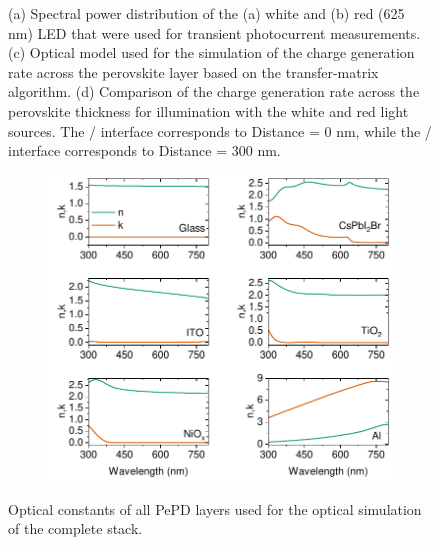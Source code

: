 \begin{figure}[t]
\begin{subfigure}[t]{0.4\textwidth}
        \caption{}
        \label{}
    \end{subfigure}
    \caption{(a) Spectral power distribution of the (a) white and (b) red (625 nm) LED that were used for transient photocurrent measurements. (c) Optical model used for the simulation of the charge generation rate across the perovskite layer based on the transfer-matrix algorithm. (d) Comparison of the charge generation rate across the perovskite thickness for illumination with the white and red light sources. The / interface corresponds to Distance = 0 nm, while the / interface corresponds to Distance = 300 nm.}
    \label{fig:etl_opt:tpc_sources_and_simulation}
\end{figure}



\begin{figure}[htbp]
    \centering
    \begin{subfigure}[t]{0.7\textwidth}
        \centering
        \includegraphics[width=\textwidth]{chapters/transport_layers/images/nk_transfer_matrix.pdf} %
                
    \end{subfigure}
    \caption{Optical constants of all PePD layers used for the optical simulation of the complete stack.}
    \label{fig:tetl_opt:nk_transfer_materix}
\end{figure}


